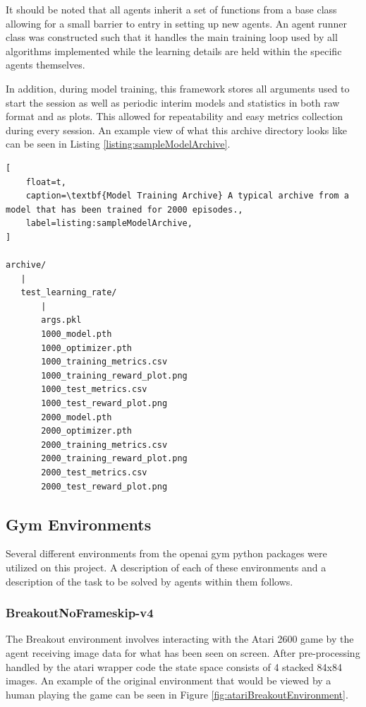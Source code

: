 \documentclass[conference]{IEEEtran}
\begin{document}
It should be noted that all agents inherit a set of functions from a base class allowing for a small barrier to entry in setting up new agents.
An agent runner class was constructed such that it handles the main training loop used by all algorithms implemented while the learning details are held within the specific agents themselves.

In addition, during model training, this framework stores all arguments used to start the session as well as periodic interim models and statistics in both raw format and as plots.
This allowed for repeatability and easy metrics collection during every session.
An example view of what this archive directory looks like can be seen in Listing \ref{listing:sampleModelArchive}.

\begin{lstlisting}[
    float=t,
    caption=\textbf{Model Training Archive} A typical archive from a model that has been trained for 2000 episodes.,
    label=listing:sampleModelArchive,
]

archive/
   |
   test_learning_rate/
       |
       args.pkl
       1000_model.pth
       1000_optimizer.pth
       1000_training_metrics.csv
       1000_training_reward_plot.png
       1000_test_metrics.csv
       1000_test_reward_plot.png
       2000_model.pth
       2000_optimizer.pth
       2000_training_metrics.csv
       2000_training_reward_plot.png
       2000_test_metrics.csv
       2000_test_reward_plot.png
\end{lstlisting}

\subsection{Gym Environments}
Several different environments from the openai gym python packages were utilized on this project.
A description of each of these environments and a description of the task to be solved by agents within them follows.

\subsubsection{BreakoutNoFrameskip-v4}
The Breakout environment involves interacting with the Atari 2600 game by the agent receiving image data for what has been seen on screen.
After pre-processing handled by the atari wrapper code the state space consists of 4 stacked 84x84 images.
An example of the original environment that would be viewed by a human playing the game can be seen in Figure \ref{fig:atariBreakoutEnvironment}.
\end{document}
